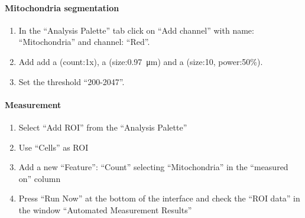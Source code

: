 \paragraph{Mitochondria segmentation}
\begin{enumerate}
    \item In the ``Analysis Palette'' tab click on ``Add channel'' with name: ``Mitochondria'' and channel: ``Red''.
    \item Add add a  (count:1x), a  (size:\SI{0.97}{\micro\meter}) and a  (size:10,  
power:50\%).
    \item Set the threshold ``200-2047''.
\end{enumerate}

\paragraph{Measurement}
\begin{enumerate}
    \item Select ``Add ROI'' from the ``Analysis Palette''
    \item Use ``Cells'' as ROI
    \item Add a new ``Feature'': ``Count'' selecting ``Mitochondria'' in the ``measured on'' column
    \item Press ``Run Now'' at the bottom of the interface and check the ``ROI data'' in the window ``Automated Measurement Results''
\end{enumerate}

